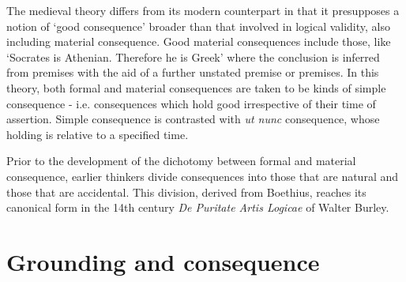\documentclass[a4paper,11pt]{article}
\begin{document}
The medieval theory differs from its modern counterpart in that it presupposes a notion of `good consequence' broader than that involved in logical validity, also including material consequence. Good material consequences include those, like `Socrates is Athenian. Therefore he is Greek' where the conclusion is inferred from premises with the aid of a further unstated premise or premises. In this theory, both formal and material consequences are taken to be kinds of simple consequence - i.e. consequences which hold good irrespective of their time of assertion. Simple consequence is contrasted with \textit{ut nunc} consequence, whose holding is relative to a specified time.

Prior to the development of the dichotomy between formal and material consequence, earlier thinkers divide consequences into those that are natural and those that are accidental. This division, derived from Boethius,  reaches its canonical form in the 14th century \textit{De Puritate Artis Logicae} of Walter Burley.

\section{Grounding and consequence}



\end{document}
